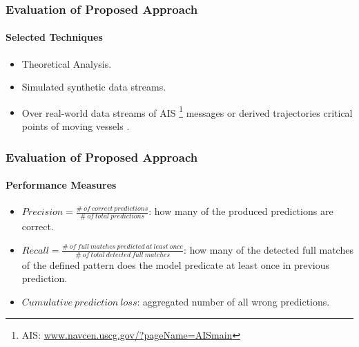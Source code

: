
\begin{frame}
	
	\frametitle{Evaluation of Proposed Approach }
	\framesubtitle{Selected Techniques}
	
	\begin{itemize}
		\item<1-> Theoretical Analysis. 
		
		\item<1-> Simulated synthetic data streams.
		
		\item<1->  Over real-world data streams of  AIS \footnote{AIS: \url{www.navcen.uscg.gov/?pageName=AISmain}} messages or derived trajectories critical points of moving vessels \citep{synopses1}. 
	\end{itemize}
	
\end{frame}

\begin{frame}
	
	\frametitle{ Evaluation of Proposed Approach }
	\framesubtitle{Performance Measures}

		\begin{itemize}
			\item<1->$\mathit{Precision = \frac{\#\ of\ correct\ predictions}{\#\ of\ total\ predictions}}$:
			 how many of the produced predictions are correct.  

 
			\item<1->  $\mathit{Recall = \frac{\#\ of\ full\ matches\ predicted\ at\ least\ once}{\#\ of\ total\ detected\ full\ matches}}$:
			 how many of the detected full matches of the defined pattern does the model predicate at least once in previous prediction. 
			
				\item<1->  $\mathit{Cumulative\ prediction\ loss}$:
		   aggregated number of all wrong predictions.
		\end{itemize}

\end{frame}



%	
%	


